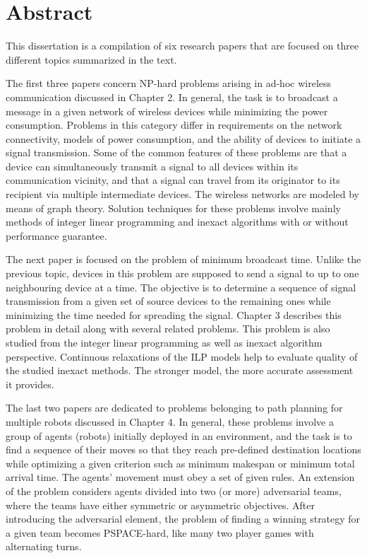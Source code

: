 \chapter{Abstract}

%
This dissertation is a compilation of six research papers that are focused on three different topics summarized in the text.

The first three papers concern NP-hard problems arising in ad-hoc wireless communication discussed in Chapter 2.
In general, the task is to broadcast a message in a given network of wireless devices while minimizing the power consumption.
Problems in this category differ in requirements on the network connectivity, models of power consumption, and the ability of devices to initiate a signal transmission.
Some of the common features of these problems are that a device can simultaneously transmit a signal to all devices within its communication vicinity,
and that a signal can travel from its originator to its recipient via multiple intermediate devices.
The wireless networks are modeled by means of graph theory.
Solution techniques for these problems involve mainly methods of integer linear programming and inexact algorithms with or without performance guarantee.

The next paper is focused on the problem of minimum broadcast time.
Unlike the previous topic, devices in this problem are supposed to send a signal to up to one neighbouring device at a time.
The objective is to determine a sequence of signal transmission from a given set of source devices to the remaining ones while minimizing the time needed for spreading the signal.
Chapter 3 describes this problem in detail along with several related problems.
This problem is also studied from the integer linear programming as well as inexact algorithm perspective.
Continuous relaxations of the ILP models help to evaluate quality of the studied inexact methods.
The stronger model, the more accurate assessment it provides.

The last two papers are dedicated to problems belonging to path planning for multiple robots discussed in Chapter 4.
In general, these problems involve a group of agents (robots) initially deployed in an environment, and the task is to find a sequence of their moves
so that they reach pre-defined destination locations while optimizing a given criterion such as minimum makespan or minimum total arrival time.
The agents' movement must obey a set of given rules.
An extension of the problem considers agents divided into two (or more) adversarial teams, where the teams have either symmetric or asymmetric objectives.
After introducing the adversarial element, the problem of finding a winning strategy for a given team becomes PSPACE-hard, like many two player games with alternating turns.

